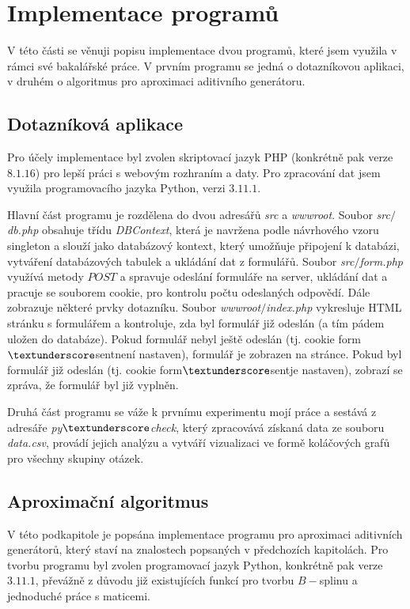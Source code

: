 \section{Implementace programů}
V této části se věnuji popisu implementace dvou program\r u, které jsem využila v rámci své bakalářské práce. V prvním programu se jedná o dotazníkovou aplikaci, v druhém o algoritmus pro aproximaci aditivního generátoru.
\subsection{Dotazníková aplikace}
Pro \' učely implementace byl zvolen skriptovací jazyk PHP (konkrétně pak verze $8.1.16$) pro lepší práci s webovým rozhraním a daty. Pro zpracování dat jsem využila programovacího jazyka Python, verzi $3.11.1$. 

Hlavní část programu je rozdělena do dvou adresář\r u \textit{src} a \textit{wwwroot}. Soubor \textit{src$\slash$db.php} obsahuje třídu \textit{DBContext}, která je navržena podle návrhového vzoru singleton a slouží jako databázový kontext, který umožňuje připojení k databázi, vytváření databázových tabulek a ukládání dat z formulářů. Soubor \textit{src$\slash$form.php} využívá metody $POST$ a spravuje odeslání formuláře na server, ukládání dat a pracuje se souborem cookie, pro kontrolu počtu odeslaných odpovědí. Dále zobrazuje některé prvky dotazníku. Soubor \textit{wwwroot$\slash$index.php} vykresluje HTML stránku s formulářem a kontroluje, zda byl formulář již odeslán (a tím pádem uložen do databáze). Pokud formulář nebyl ještě odeslán (tj. cookie \clqq form$\textunderscore$sent\crqq \space není nastaven), formulář je zobrazen na stránce. Pokud byl formulář již odeslán (tj. cookie \clqq form$\textunderscore$sent\crqq \space je nastaven), zobrazí se zpráva, že formulář byl již vyplněn.

Druhá část programu se váže k prvnímu experimentu mojí práce a sestává z adresáře \textit{py$\textunderscore$check}, který zpracovává získaná data ze souboru \textit{data.csv}, provádí jejich analýzu a vytváří vizualizaci ve formě koláčových grafů pro všechny skupiny otázek.
\subsection{Aproximační algoritmus}
V této podkapitole je popsána implementace programu pro aproximaci aditivních generátor\r u, který staví na znalostech popsaných v předchozích kapitolách. Pro tvorbu programu byl zvolen programovací jazyk Python, konkrétně pak verze $3.11.1$, převážně z d\r uvodu již existujících funkcí pro tvorbu $B-$splinu a jednoduché práce s maticemi.

